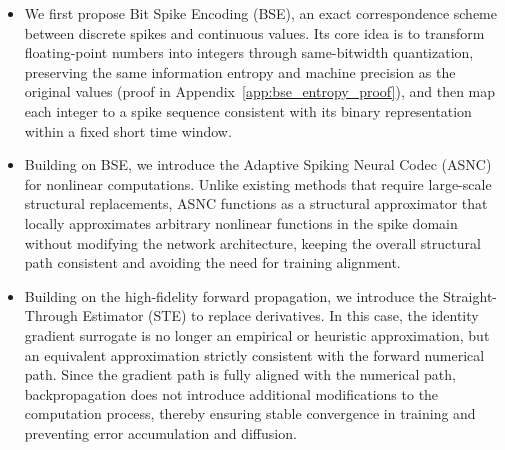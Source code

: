 \documentclass{article}
\theoremstyle{plain}
\theoremstyle{definition}
\theoremstyle{remark}
\begin{document}
\begin{itemize}
    \item We first propose Bit Spike Encoding (BSE), an exact correspondence scheme between discrete spikes and continuous values. Its core idea is to transform floating-point numbers into integers through same-bitwidth quantization, preserving the same information entropy and machine precision as the original values (proof in Appendix~\ref{app:bse_entropy_proof}), and then map each integer to a spike sequence consistent with its binary representation within a fixed short time window.
    \item Building on BSE, we introduce the Adaptive Spiking Neural Codec (ASNC) for nonlinear computations. Unlike existing methods that require large-scale structural replacements, ASNC functions as a structural approximator that locally approximates arbitrary nonlinear functions in the spike domain without modifying the network architecture, keeping the overall structural path consistent and avoiding the need for training alignment.
    \item Building on the high-fidelity forward propagation, we introduce the Straight-Through Estimator (STE) to replace derivatives. In this case, the identity gradient surrogate is no longer an empirical or heuristic approximation, but an equivalent approximation strictly consistent with the forward numerical path. Since the gradient path is fully aligned with the numerical path, backpropagation does not introduce additional modifications to the computation process, thereby ensuring stable convergence in training and preventing error accumulation and diffusion.


\end{itemize}
\end{document}
